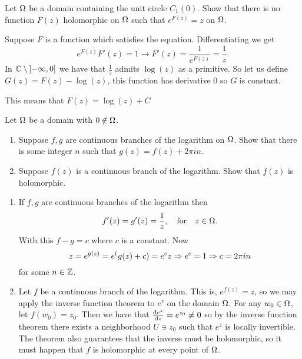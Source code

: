 \documentclass[12pt]{memoir}
\begin{document}
\begin{Ej}
    Let $\Omega$ be a domain containing the unit circle $C_1(0)$. Show that there is no function $F(z)$ holomorphic on $\Omega$ such that $e^{F(z)}=z$ on $\Omega$. 
\end{Ej}

\begin{ptcbr}
Suppose $F$ is a function which satisfies the equation. Differentiating we get 
$$e^{F(z)}F'(z)=1\to F'(z)=\frac{1}{e^{F(z)}}=\frac1z.$$
In $\mathbb{C}\setminus\left\rbrack-\infty,0\right\rbrack$ we have that $\frac{1}{z}$ admits $\log(z)$ as a primitive. So let us define $G(z)=F(z)-\log(z)$, this function has derivative $0$ so $G$ is constant.\par 
This means that $F(z)=\log(z)+C$
\end{ptcbr}

\begin{Ej}
    Let $\Omega$ be a domain with $0\not\in\Omega$.
    \begin{enumerate}
        \itemsep=-0.4em
        \item Suppose $f,g$ are continuous branches of the logarithm on $\Omega$. Show that there is some integer $n$ such that $g(z)=f(z)+2\pi i n$. 
        \item Suppose $f(z)$ is a continuous branch of the logarithm. Show that $f(z)$ is holomorphic. 
    \end{enumerate}
\end{Ej}

\begin{ptcbr}
    \begin{enumerate}
        \itemsep=-0.4em
        \item If $f,g$ are continuous branches of the logarithm then 
        $$f'(z)=g'(z)=\frac{1}{z},\quad\text{for}\quad z\in\Omega.$$
        With this $f-g=c$ where $c$ is a constant. Now 
        $$z=e^{g(z)}=e^(g(z)+c)=e^c z\Rightarrow e^c=1\Rightarrow c=2\pi i n$$
        for some $n\in\mathbb{Z}$. 
        \item Let $f$ be a continuous branch of the logarithm. This is, $e^{f(z)}=z$, so we may apply the inverse function theorem to $e^z$ on the domain $\Omega$.
        For any $w_0\in\Omega$, let $f(w_0)=z_0$. Then we have that $\dv{e^z}{z}(z_0)=e^{z_0}\neq 0$ so by the inverse function theorem there exists a neighborhood $U\ni z_0$ such that $e^z$ is locally invertible. The theorem also guarantees that the inverse must be holomorphic, so it must happen that $f$ is holomorphic at every point of $\Omega$. 
    \end{enumerate}
\end{ptcbr}
\end{document}
